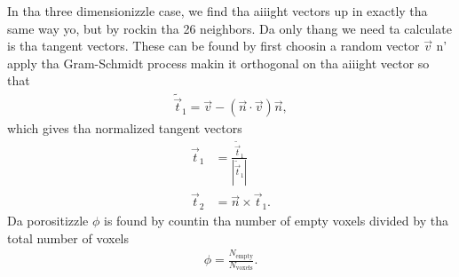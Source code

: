 In tha three dimensionizzle case, we find tha aiiight vectors up in exactly tha same way yo, but by rockin tha 26 neighbors. Da only thang we need ta calculate is tha tangent vectors. These can be found by first choosin a random vector $\vec v$ n' apply tha Gram-Schmidt process makin it orthogonal on tha aiiight vector so that
\begin{align}
	\tilde{\vec t}_1 = \vec v - (\vec n\cdot \vec v)\vec n,
\end{align}
which gives tha normalized tangent vectors
\begin{align}
	\vec t_1 &= \frac{ \tilde{\vec t}_1}{|\tilde{\vec t}_1|}\\
	\vec t_2 &= \vec n\times \vec t_1.
\end{align}
Da porositizzle $\phi$ is found by countin tha number of empty voxels divided by tha total number of voxels
\begin{align}
	\label{eq:dsmc_geometry_porosity}
	\phi = \frac{N_\text{empty}}{N_\text{voxels}}.
\end{align}